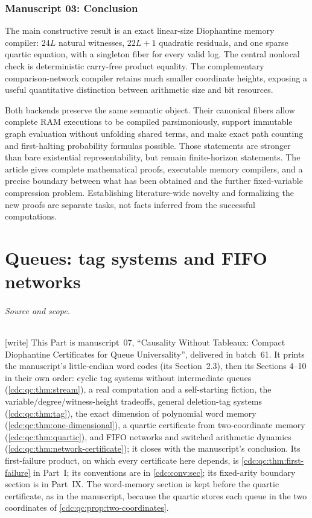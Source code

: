 \documentclass[11pt,a4paper]{article}
\theoremstyle{definition}
\theoremstyle{remark}
\newcommand{\wtag}{\textup{[write]}}%
\newcommand{\srctag}[1]{\texorpdfstring{\hspace{0.5em}{\normalfont\small\color{accent}[#1]}}{ [#1]}}
\begin{document}
\section{Manuscript 03: Conclusion\srctag{03}}
The main constructive result is an exact linear-size Diophantine memory
compiler: $24L$ natural witnesses, $22L+1$ quadratic residuals, and one sparse
quartic equation, with a singleton fiber for every valid log. The central
nonlocal check is deterministic carry-free product equality. The complementary
comparison-network compiler retains much smaller coordinate heights, exposing
a useful quantitative distinction between arithmetic size and bit resources.

Both backends preserve the same semantic object. Their canonical fibers allow
complete RAM executions to be compiled parsimoniously, support immutable graph
evaluation without unfolding shared terms, and make exact path counting and
first-halting probability formulas possible. Those statements are stronger than
bare existential representability, but remain finite-horizon statements.
The article gives complete mathematical proofs, executable memory compilers,
and a precise boundary between what has been obtained and the further
fixed-variable compression problem. Establishing literature-wide novelty and
formalizing the new proofs are separate tasks, not facts inferred from the
successful computations.


\part{Queues: tag systems and FIFO networks}\label{cdc:part:queues}

\paragraph{Source and scope.} \wtag{} This Part is manuscript~07, ``Causality Without Tableaux: Compact Diophantine Certificates for Queue Universality'', delivered in batch~61. It prints the manuscript's little-endian word codes (its Section~2.3), then its Sections 4--10 in their own order: cyclic tag systems without intermediate queues (\cref{cdc:qc:thm:stream}), a real computation and a self-starting fiction, the variable/degree/witness-height tradeoffs, general deletion-tag systems (\cref{cdc:qc:thm:tag}), the exact dimension of polynomial word memory (\cref{cdc:qc:thm:one-dimensional}), a quartic certificate from two-coordinate memory (\cref{cdc:qc:thm:quartic}), and FIFO networks and switched arithmetic dynamics (\cref{cdc:qc:thm:network-certificate}); it closes with the manuscript's conclusion. Its first-failure product, on which every certificate here depends, is \cref{cdc:qc:thm:first-failure} in Part~I; its conventions are in \cref{cdc:conv:sec}; its fixed-arity boundary section is in Part~IX. The word-memory section is kept before the quartic certificate, as in the manuscript, because the quartic stores each queue in the two coordinates of \cref{cdc:qc:prop:two-coordinates}.
\end{document}
